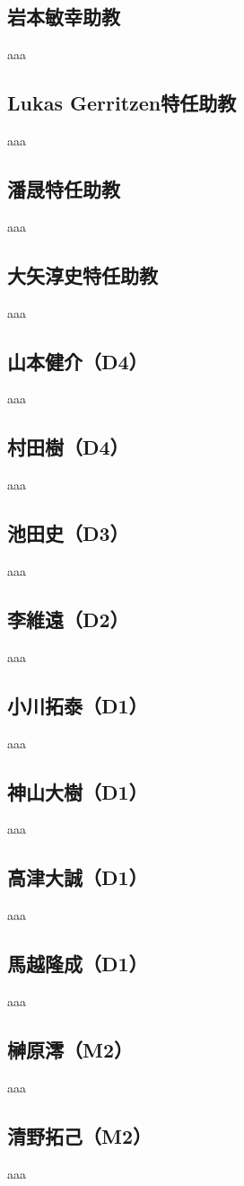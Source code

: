 \subsection{岩本敏幸助教}
aaa
\subsection{Lukas Gerritzen特任助教}
aaa
\subsection{潘晟特任助教}
aaa
\subsection{大矢淳史特任助教}
aaa
\subsection{山本健介（D4）}
aaa
\subsection{村田樹（D4）}
aaa
\subsection{池田史（D3）}
aaa
\subsection{李維遠（D2）}
aaa
\subsection{小川拓泰（D1）}
aaa
\subsection{神山大樹（D1）}
aaa
\subsection{高津大誠（D1）}
aaa
\subsection{馬越隆成（D1）}
aaa
\subsection{榊原澪（M2）}
aaa
\subsection{清野拓己（M2）}
aaa

